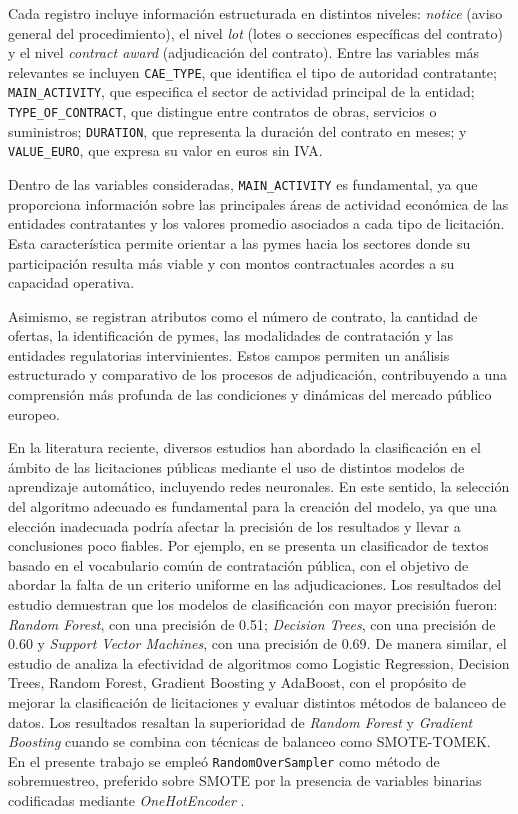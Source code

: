 \documentclass[a4paper,fleqn]{cas-sc}
\begin{document}
Cada registro incluye información estructurada en distintos niveles:
\textit{notice} (aviso general del procedimiento), el nivel \textit{lot} (lotes o secciones específicas del contrato) y el nivel \textit{contract award} (adjudicación del contrato).
Entre las variables más relevantes se incluyen 
\texttt{CAE\_TYPE}, que identifica el tipo de autoridad contratante; 
\texttt{MAIN\_ACTIVITY}, que especifica el sector de actividad principal de la entidad; 
\texttt{TYPE\_OF\_CONTRACT}, que distingue entre contratos de obras, servicios o suministros; \texttt{DURATION}, que representa la duración del contrato en meses; 
y \texttt{VALUE\_EURO}, que expresa su valor en euros sin IVA.

	Dentro de las variables consideradas, \texttt{MAIN\_ACTIVITY} es fundamental, ya que proporciona información sobre las principales áreas de actividad económica de las entidades contratantes y los valores promedio asociados a cada tipo de licitación.  Esta característica permite orientar a las pymes hacia los sectores donde su participación resulta más viable y con montos contractuales acordes a su capacidad operativa.

	Asimismo, se registran atributos como el número de contrato, la cantidad de ofertas, la identificación de pymes, las modalidades de contratación y las entidades regulatorias intervinientes. Estos campos permiten un análisis estructurado y comparativo de los procesos de adjudicación, contribuyendo a una comprensión más profunda de las condiciones y dinámicas del mercado público europeo.

En la literatura reciente, diversos estudios han abordado la clasificación en el ámbito de las licitaciones públicas mediante el uso de distintos modelos de aprendizaje automático, 
incluyendo redes neuronales. En este sentido,  la selección del algoritmo adecuado  es fundamental para la creación del modelo, ya que una elección inadecuada podría afectar la precisión de los resultados y llevar a conclusiones poco fiables. Por ejemplo, en \cite{NavasLoro2022} se presenta un clasificador de textos basado en el vocabulario común de contratación pública, con el objetivo de abordar la falta de un criterio uniforme en las adjudicaciones. Los resultados del estudio demuestran que los modelos de clasificación con mayor precisión fueron: 
\textit{Random Forest}, %
con una precisión de 0.51; 
\textit{Decision Trees}, %
con una precisión de 0.60 y 
\textit{Support Vector Machines}, %
con una precisión de 0.69.  
De manera similar, el estudio de \cite{FigueroaGomez2024} analiza la efectividad de algoritmos como 
Logistic Regression, Decision Trees, Random Forest, Gradient Boosting y AdaBoost, 
con el propósito de mejorar la clasificación de licitaciones y evaluar distintos métodos de balanceo de datos. Los resultados resaltan la superioridad de \textit{Random Forest} y \textit{Gradient Boosting} cuando se combina con técnicas de balanceo como SMOTE-TOMEK. En el presente trabajo se empleó \texttt{RandomOverSampler} como método de sobremuestreo, preferido sobre SMOTE por la presencia de variables binarias codificadas mediante \textit{OneHotEncoder} \cite{geron2019hands}.
\end{document}
